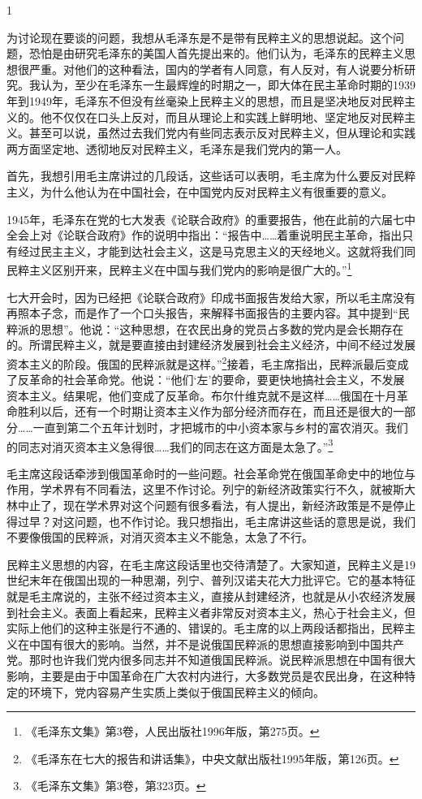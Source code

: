 \documentclass[UTF8, 12pt, a4paper]{ctexrep}
\begin{document}
1

为讨论现在要谈的问题，我想从毛泽东是不是带有民粹主义的思想说起。这个问题，恐怕是由研究毛泽东的美国人首先提出来的。他们认为，毛泽东的民粹主义思想很严重。对他们的这种看法，国内的学者有人同意，有人反对，有人说要分析研究。我认为，至少在毛泽东一生最辉煌的时期之一，即大体在民主革命时期的1939年到1949年，毛泽东不但没有丝毫染上民粹主义的思想，而且是坚决地反对民粹主义的。他不仅仅在口头上反对，而且从理论上和实践上鲜明地、坚定地反对民粹主义。甚至可以说，虽然过去我们党内有些同志表示反对民粹主义，但从理论和实践两方面坚定地、透彻地反对民粹主义，毛泽东是我们党内的第一人。

首先，我想引用毛主席讲过的几段话，这些话可以表明，毛主席为什么要反对民粹主义，为什么他认为在中国社会，在中国党内反对民粹主义有很重要的意义。

1945年，毛泽东在党的七大发表《论联合政府》的重要报告，他在此前的六届七中全会上对《论联合政府》作的说明中指出：“报告中……着重说明民主革命，指出只有经过民主主义，才能到达社会主义，这是马克思主义的天经地义。这就将我们同民粹主义区别开来，民粹主义在中国与我们党内的影响是很广大的。”\footnote{《毛泽东文集》第3卷，人民出版社1996年版，第275页。}

七大开会时，因为已经把《论联合政府》印成书面报告发给大家，所以毛主席没有再照本子念，而是作了一个口头报告，来解释书面报告的主要内容。其中提到“民粹派的思想”。他说：“这种思想，在农民出身的党员占多数的党内是会长期存在的。所谓民粹主义，就是要直接由封建经济发展到社会主义经济，中间不经过发展资本主义的阶段。俄国的民粹派就是这样。”\footnote{《毛泽东在七大的报告和讲话集》，中央文献出版社1995年版，第126页。}接着，毛主席指出，民粹派最后变成了反革命的社会革命党。他说：“他们‘左’的要命，要更快地搞社会主义，不发展资本主义。结果呢，他们变成了反革命。布尔什维克就不是这样……俄国在十月革命胜利以后，还有一个时期让资本主义作为部分经济而存在，而且还是很大的一部分……一直到第二个五年计划时，才把城市的中小资本家与乡村的富农消灭。我们的同志对消灭资本主义急得很……我们的同志在这方面是太急了。”\footnote{《毛泽东文集》第3卷，第323页。}

毛主席这段话牵涉到俄国革命时的一些问题。社会革命党在俄国革命史中的地位与作用，学术界有不同看法，这里不作讨论。列宁的新经济政策实行不久，就被斯大林中止了，现在学术界对这个问题有很多看法，有人提出，新经济政策是不是停止得过早？对这问题，也不作讨论。我只想指出，毛主席讲这些话的意思是说，我们不要像俄国的民粹派，对消灭资本主义不能急，太急了不行。

民粹主义思想的内容，在毛主席这段话里也交待清楚了。大家知道，民粹主义是19世纪末年在俄国出现的一种思潮，列宁、普列汉诺夫花大力批评它。它的基本特征就是毛主席说的，主张不经过资本主义，直接从封建经济，也就是从小农经济发展到社会主义。表面上看起来，民粹主义者非常反对资本主义，热心于社会主义，但实际上他们的这种主张是行不通的、错误的。毛主席的以上两段话都指出，民粹主义在中国有很大的影响。当然，并不是说俄国民粹派的思想直接影响到中国共产党。那时也许我们党内很多同志并不知道俄国民粹派。说民粹派思想在中国有很大影响，主要是由于中国革命在广大农村内进行，大多数党员是农民出身，在这种特定的环境下，党内容易产生实质上类似于俄国民粹主义的倾向。
\end{document}
